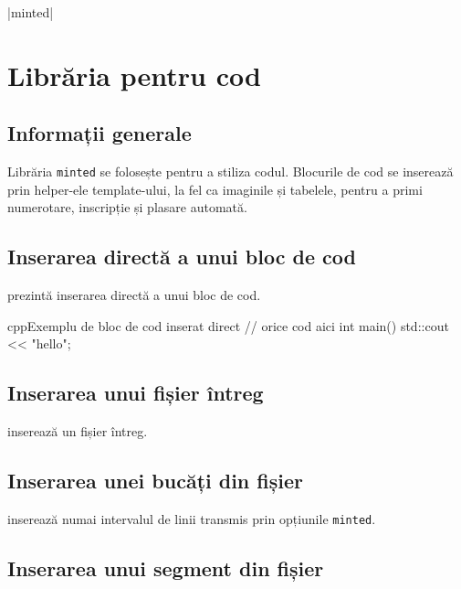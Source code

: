 \documentclass[a4paper,12pt]{report}
\begin{document}
|minted|

\section[Librăria minted pentru cod]{Librăria  pentru cod}

\subsection{Informații generale}

Librăria \verb|minted| se folosește pentru a stiliza codul.
Blocurile de cod se inserează prin helper-ele template-ului, la fel ca imaginile și tabelele,
pentru a primi numerotare, inscripție și plasare automată.

\subsection{Inserarea directă a unui bloc de cod}

 prezintă inserarea directă a unui bloc de cod.

\begin{code}{cpp}{Exemplu de bloc de cod inserat direct}
// orice cod aici
int main()
{
    std::cout << "hello";
}
\end{code}

\subsection{Inserarea unui fișier întreg}

 inserează un fișier întreg.


\subsection{Inserarea unei bucăți din fișier}

 inserează numai intervalul de linii transmis prin opțiunile \verb|minted|.


\subsection{Inserarea unui segment din fișier}
\end{document}
